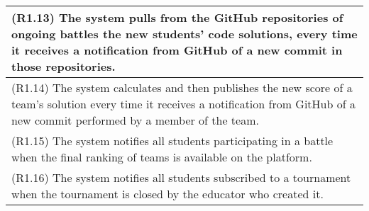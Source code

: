 \begin{longtable}{|p{16.5cm}|}
\hline 
(R1.13) The system pulls from the GitHub repositories of ongoing battles the new students' code solutions, every time it receives a notification from GitHub of a new commit in those repositories. \\
\hline 
(R1.14) The system calculates and then publishes the new score of a team's solution every time it receives a notification from GitHub of a new commit performed by a member of the team. \\
\hline
(R1.15) The system notifies all students participating in a battle when the final ranking of teams is available on the platform.  \\
\hline
(R1.16) The system notifies all students subscribed to a tournament when the tournament is closed by the educator who created it.\\
\hline
\end{longtable}


